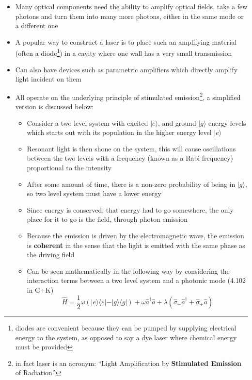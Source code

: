 \documentclass[english]{article}
\newcommand{\ket}[1]{|#1 \rangle}
\newcommand{\ketbra}[2]{\vert #1 \rangle \! \langle #2 \vert}
\begin{document}
\begin{itemize}
\item Many optical components need the ability to amplify optical fields, take a few photons and turn them into many more photons, either in the same mode or a different one
\item A popular way to construct a laser is to place such an amplifying material (often a diode\footnote{diodes are convenient because they can be pumped by supplying electrical energy to the system, as opposed to say a dye laser where chemical energy must be provided}) in a cavity where one wall has a very small transmission
\item Can also have devices such as parametric amplifiers which directly amplify light incident on them
\item All operate on the underlying principle of stimulated emission\footnote{in fact laser is an acronym: ``Light Amplification by \textbf{Stimulated Emission} of Radiation''}, a simplified version is discussed below:
\begin{itemize}
\item Consider a two-level system with excited $\ket{e}$, and ground $\ket{g}$ energy levels which starts out with its population in the higher energy level $\ket{e}$
\item Resonant light is then shone on the system, this will cause oscillations between the two levels with a frequency (known as a Rabi frequency) proportional to the intensity
\item After some amount of time, there is a non-zero probability of being in $\ket{g}$, so two level system must have a lower energy
\item Since energy is conserved, that energy had to go somewhere, the only place for it to go is the field, through photon emission
\item Because the emission is driven by the electromagnetic wave, the emission is \textbf{coherent} in the sense that the light is emitted with the same phase as the driving field
\item Can be seen mathematically in the following way by considering the interaction terms between a two level system and a photonic mode (4.102 in G+K)
\begin{equation}
\hat{H}=\frac{1}{2}\omega\left(\ketbra{e}{e}-\ketbra{g}{g}\right)+\omega \hat{a}^\dagger \hat{a}+ \lambda \left(\hat{\sigma}_-\hat{a}^\dagger+\hat{\sigma}_+\hat{a}\right)
\end{equation}
\begin{enumerate}

\end{enumerate}
\end{itemize}
\end{itemize}
\end{document}
